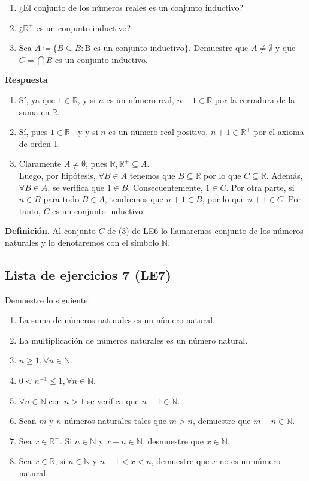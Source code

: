 \documentclass[11pt]{article}
\newcommand{\N}{\mathbb{N}}
\newcommand{\R}{\mathbb{R}}
\begin{document}
\begin{enumerate}[label=\arabic*)]
    \item ¿El conjunto de los números reales es un conjunto inductivo?
    \item ¿$\R^+$ es un conjunto inductivo?
    \item Sea $A\coloneqq \{B \subseteq B: \text{B es un conjunto inductivo}\}$. Demuestre que $A\neq \emptyset$ y que $C=\bigcap B$ es un conjunto inductivo.
\end{enumerate}

\textbf{Respuesta}

\begin{enumerate}[label=\arabic*)]
    \item Sí, ya que $1 \in \R$, y si $n$ es un número real, $n+1 \in \R$ por la cerradura de la suma en $\R$.
    \item Sí, pues $1\in \R^+$ y y si $n$ es un número real positivo, $n+1 \in \R^+$ por el axioma de orden 1.
    \item Claramente $A \neq \emptyset$, pues $\R, \R^+ \subseteq A$. \\[5pt]Luego, por hipótesis, $\forall B \in A$ tenemos que $B\subseteq \R $ por lo que $C\subseteq \R$. Además, $\forall B\in A$, se verifica que $1\in B$. Consecuentemente, $1\in C$. Por otra parte, si $n\in B$ para todo $B\in A$, tendremos que $n+1\in B$, por lo que $n+1 \in C$. Por tanto, $C$ es un conjunto inductivo.
\end{enumerate}

\textbf{Definición.} Al conjunto $C$ de (3) de LE6 lo llamaremos conjunto de los números naturales y lo denotaremos con el símbolo $\N$.

\subsection*{Lista de ejercicios 7 (LE7)}

Demuestre lo siguiente:

\begin{enumerate}[label=\alph*)]
    \item La suma de números naturales es un número natural.
    \item La multiplicación de números naturales es un número natural.
    \item $n\geq 1, \forall n\in \N$.
    \item $0<n^{-1}\leq 1, \forall n\in \N$.
    \item $\forall n\in \N$ con $n>1$ se verifica que $n-1\in \N$.
    \item Sean $m$ y $n$ números naturales tales que $m>n$, demuestre que $m-n\in\N$.
    \item Sea $x\in \R^+$. Si $n\in \N$ y $x+n\in \N$, desmuestre que $x\in \N$.
    \item Sea $x\in \R$, si $n\in \N$ y $n-1<x<n$, demuestre que $x$ no es un número natural.
\end{enumerate}
\end{document}
